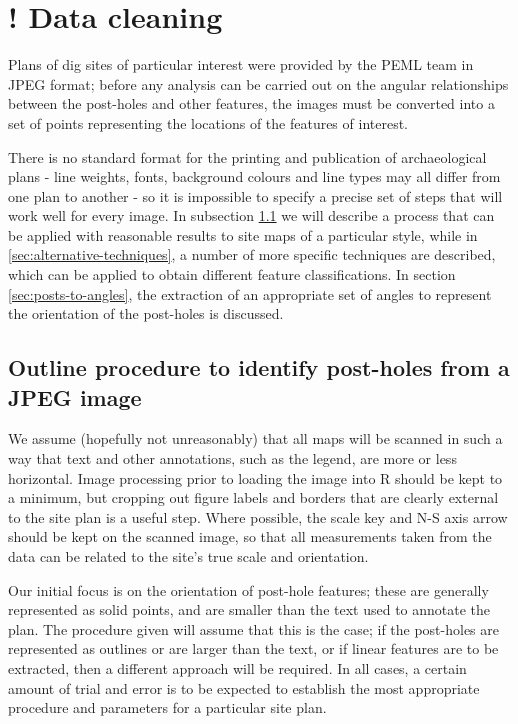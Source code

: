 \documentclass[../../ArchStats.tex]{subfiles}
\begin{document}
\section{! Data cleaning}

Plans of dig sites of particular interest were provided by the PEML team in JPEG format; before any analysis can be carried out on the angular relationships between the post-holes and other features, the images must be converted into a set of points representing the locations of the features of interest.

There is no standard format for the printing and publication of archaeological plans - line weights, fonts, background colours and line types may all differ from one plan to another - so it is impossible to specify a precise set of steps that will work well for every image. In subsection \ref{sec:points-to-JPEG} we will describe a process that can be applied with reasonable results to site maps of a particular style, while in \ref{sec:alternative-techniques}, a number of more specific techniques are described, which can be applied to obtain different feature classifications. In section \ref{sec:posts-to-angles}, the extraction of an appropriate set of angles to represent the orientation of the post-holes is discussed.



\subsection{Outline procedure to identify post-holes from a JPEG image}
\label{sec:points-to-JPEG}

We assume (hopefully not unreasonably) that all maps will be scanned in such a way that text and other annotations, such as the legend, are more or less horizontal. Image processing prior to loading the image into R should be kept to a minimum, but cropping out figure labels and borders that are clearly external to the site plan is a useful step. Where possible, the scale key and N-S axis arrow should be kept on the scanned image, so that all measurements taken from the data can be related to the site's true scale and orientation.

Our initial focus is on the orientation of post-hole features; these are generally represented as solid points, and are smaller than the text used to annotate the plan. The procedure given will assume that this is the case; if the post-holes are represented as outlines or are larger than the text, or if linear features are to be extracted, then a different approach will be required. In all cases, a certain amount of trial and error is to be expected to establish the most appropriate procedure and parameters for a particular site plan.
\end{document}
